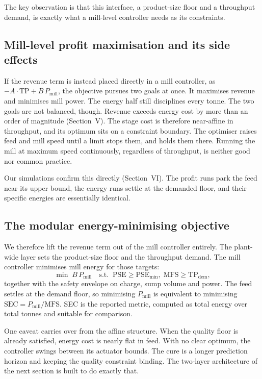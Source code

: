 \documentclass[conference]{IEEEtran}
\begin{document}
The key observation is that this interface, a product-size floor and a
throughput demand, is exactly what a mill-level controller needs as its
constraints.

\subsection{Mill-level profit maximisation and its side effects}

If the revenue term is instead placed directly in a mill controller, as
$-A\cdot\mathrm{TP} + B\,P_{\mathrm{mill}}$, the objective pursues two
goals at once. It maximises revenue and minimises mill power. The energy
half still disciplines every tonne. The two goals are not balanced,
though. Revenue exceeds energy cost by more than an order of magnitude
(Section~V). The
stage cost is therefore near-affine in throughput, and its optimum sits on
a constraint boundary. The optimiser raises feed and mill speed until a
limit stops them, and holds them there. Running the mill at maximum speed
continuously, regardless of throughput, is neither good nor common
practice.

Our simulations confirm this directly (Section~VI). The profit runs park
the feed near its upper bound, the energy runs settle at the demanded
floor, and their specific energies are essentially identical.

\subsection{The modular energy-minimising objective}

We therefore lift the revenue term out of the mill controller entirely.
The plant-wide layer sets the product-size floor and the throughput
demand. The mill controller minimises mill energy for those targets:
\begin{equation}
\min \; B\,P_{\mathrm{mill}}
\quad \mathrm{s.t.}\;\; \mathrm{PSE}\ge \mathrm{PSE}_{\min},\;
\mathrm{MFS}\ge \mathrm{TP}_{\mathrm{dem}},
\label{eq:sec}
\end{equation}
together with the safety envelope on charge, sump volume and power. The
feed settles at the demand floor, so minimising
$P_{\mathrm{mill}}$ is equivalent to minimising
$\mathrm{SEC}=P_{\mathrm{mill}}/\mathrm{MFS}$. SEC is the
reported metric, computed as total energy over total tonnes and suitable
for comparison.

One caveat carries over from the affine structure. When the quality floor
is already satisfied, energy cost is nearly flat in feed. With no clear
optimum, the controller swings between its actuator bounds. The cure is a longer prediction horizon
and keeping the quality constraint binding. The two-layer architecture of
the next section is built to do exactly that.
\end{document}
